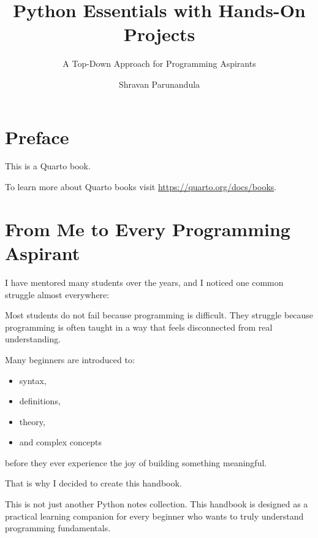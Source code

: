 \documentclass[
  letterpaper,
  DIV=11,
  numbers=noendperiod]{scrreprt}
\title{Python Essentials with Hands-On Projects}
\subtitle{A Top-Down Approach for Programming Aspirants}
\author{Shravan Parunandula}
\date{}
\providecommand{\tightlist}{%
  \setlength{\itemsep}{0pt}\setlength{\parskip}{0pt}}
\renewcommand*\contentsname{Table of contents}
\newcommand\contentsname{Table of contents}
\begin{document}
\maketitle

\renewcommand*\contentsname{Table of contents}
{
\setcounter{tocdepth}{2}
\tableofcontents
}


\chapter*{Preface}\label{preface}


This is a Quarto book.

To learn more about Quarto books visit
\url{https://quarto.org/docs/books}.


\chapter*{From Me to Every Programming
Aspirant}\label{from-me-to-every-programming-aspirant}


I have mentored many students over the years, and I noticed one common
struggle almost everywhere:

Most students do not fail because programming is difficult. They
struggle because programming is often taught in a way that feels
disconnected from real understanding.

Many beginners are introduced to:

\begin{itemize}
\tightlist
\item
  syntax,
\item
  definitions,
\item
  theory,
\item
  and complex concepts
\end{itemize}

before they ever experience the joy of building something meaningful.

That is why I decided to create this handbook.

This is not just another Python notes collection. This handbook is
designed as a practical learning companion for every beginner who wants
to truly understand programming fundamentals.
\end{document}

